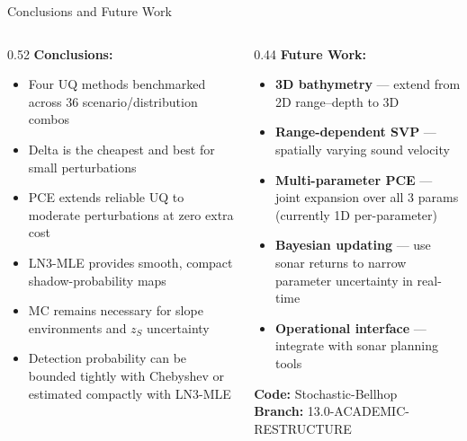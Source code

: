 \documentclass[aspectratio=169,12pt]{beamer}
\begin{document}
\begin{frame}{Conclusions and Future Work}
  \begin{columns}[T]
    \begin{column}{0.52\textwidth}
      \textbf{Conclusions:}
      \begin{itemize}\itemsep5pt
        \item Four UQ methods benchmarked across 36 scenario/distribution combos
        \item Delta is the cheapest and best for small perturbations
        \item PCE extends reliable UQ to moderate perturbations at zero extra cost
        \item LN3-MLE provides smooth, compact shadow-probability maps
        \item MC remains necessary for slope environments and $z_S$ uncertainty
        \item Detection probability can be bounded tightly with Chebyshev
              or estimated compactly with LN3-MLE
      \end{itemize}
    \end{column}
    \begin{column}{0.44\textwidth}
      \textbf{Future Work:}
      \begin{itemize}\itemsep5pt
        \item \textbf{3D bathymetry} — extend from 2D range--depth to 3D
        \item \textbf{Range-dependent SVP} — spatially varying sound velocity
        \item \textbf{Multi-parameter PCE} — joint expansion over all 3 params
              (currently 1D per-parameter)
        \item \textbf{Bayesian updating} — use sonar returns to narrow
              parameter uncertainty in real-time
        \item \textbf{Operational interface} — integrate with sonar planning tools
      \end{itemize}

      \vspace{0.5em}
      \begin{center}
        \textbf{Code:} Stochastic-Bellhop\\
        \textbf{Branch:} 13.0-ACADEMIC-RESTRUCTURE
      \end{center}
    \end{column}
  \end{columns}
\end{frame}
\end{document}
